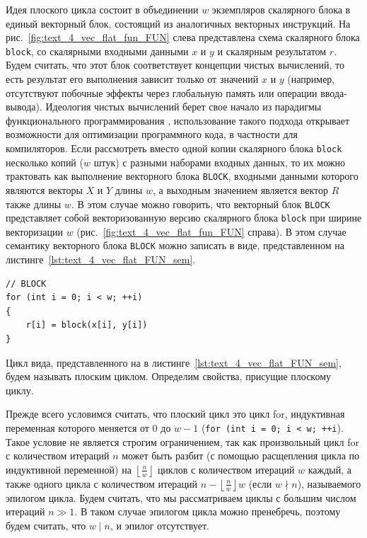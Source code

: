 Идея плоского цикла состоит в объединении $w$ экземпляров скалярного блока в единый векторный блок, состоящий из аналогичных векторных инструкций.
На рис.~\ref{fig:text_4_vec_flat_fun_FUN} слева представлена схема скалярного блока \texttt{block}, со скалярными входными данными $x$ и $y$ и скалярным результатом $r$.
Будем считать, что этот блок соответствует концепции чистых вычислений, то есть результат его выполнения зависит только от значений $x$ и $y$ (например, отсутствуют побочные эффекты через глобальную память или операции ввода-вывода).
Идеология чистых вычислений берет свое начало из парадигмы функционального программирования \cite{Armstrong2013VecErlang}, использование такого подхода открывает возможности для оптимизации программного кода, в частности для компиляторов.
Если рассмотреть вместо одной копии скалярного блока \texttt{block} несколько копий ($w$ штук) с разными наборами входных данных, то их можно трактовать как выполнение векторного блока \texttt{BLOCK}, входными данными которого являются векторы $X$ и $Y$ длины $w$, а выходным значением является вектор $R$ также длины $w$.
В этом случае можно говорить, что векторный блок \texttt{BLOCK} представляет собой векторизованную версию скалярного блока \texttt{block} при ширине векторизации $w$ (рис.~\ref{fig:text_4_vec_flat_fun_FUN} справа).
В этом случае семантику векторного блока \texttt{BLOCK} можно записать в виде, представленном на листинге~\ref{lst:text_4_vec_flat_FUN_sem}.

\begin{singlespace}
\begin{lstlisting}[caption={Семантика векторного блока \texttt{BLOCK} -- векторизованной версии скалярного блока \texttt{block}.},label={lst:text_4_vec_flat_FUN_sem}]
// BLOCK
for (int i = 0; i < w; ++i)
{
   	r[i] = block(x[i], y[i])
}
\end{lstlisting}
\end{singlespace}

Цикл вида, представленного на в листинге~\ref{lst:text_4_vec_flat_FUN_sem}, будем называть плоским циклом.
Определим свойства, присущие плоскому циклу.

Прежде всего условимся считать, что плоский цикл это цикл for, индуктивная переменная которого меняется от $0$ до $w - 1$ (\texttt{for (int i = 0; i < w; ++i}).
Такое условие не является строгим ограничением, так как произвольный цикл for с количеством итераций $n$ может быть разбит (с помощью расщепления цикла по индуктивной переменной) на $\left\lfloor \frac{n}{w} \right\rfloor$ циклов с количеством итераций $w$ каждый, а также одного цикла с количеством итераций $n - \left\lfloor \frac{n}{w} \right\rfloor w$ (если $w \nmid n$), называемого эпилогом цикла.
Будем считать, что мы рассматриваем циклы с большим числом итераций $n \gg 1$.
В таком случае эпилогом цикла можно пренебречь, поэтому будем считать, что $w \mid n$, и эпилог отсутствует.

